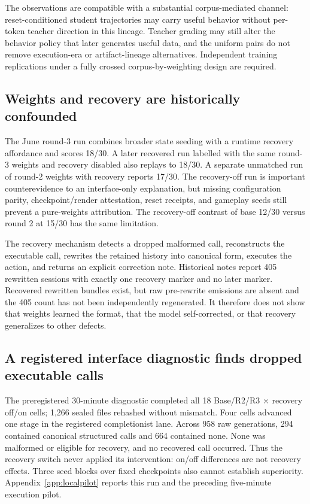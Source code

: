 \documentclass[11pt,a4paper]{article}
\begin{document}
The observations are compatible with a substantial corpus-mediated channel:
reset-conditioned student trajectories may carry useful behavior without
per-token teacher direction in this lineage. Teacher grading may still alter
the behavior policy that later generates useful data, and the uniform pairs do not remove
execution-era or artifact-lineage alternatives. Independent training
replications under a fully crossed corpus-by-weighting design are required.

\subsection{Weights and recovery are historically confounded}

The June round-3 run combines broader state seeding with a runtime recovery
affordance and scores 18/30. A later recovered run labelled with the same
round-3 weights and recovery disabled also replays to 18/30. A separate
unmatched run of round-2 weights with recovery reports 17/30. The recovery-off
run is important counterevidence to an interface-only explanation, but missing
configuration parity, checkpoint/render attestation, reset receipts, and
gameplay seeds still prevent a pure-weights attribution. The recovery-off
contrast of base 12/30 versus round 2 at 15/30 has the same limitation.

The recovery mechanism detects a dropped malformed call, reconstructs the
executable call, rewrites the retained history into canonical form, executes the
action, and returns an explicit correction note. Historical notes report 405
rewritten sessions with exactly one recovery marker and no later marker.
Recovered rewritten bundles exist, but raw pre-rewrite emissions are absent and
the 405 count has not been independently regenerated. It therefore does not show
that weights learned the format, that the model self-corrected, or that recovery
generalizes to other defects.

\subsection{A registered interface diagnostic finds dropped executable calls}

The preregistered 30-minute diagnostic completed all 18 Base/R2/R3
$\times$ recovery off/on cells; 1,266 sealed files rehashed without mismatch.
Four cells advanced one stage in the registered completionist lane. Across 958 raw generations, 294
contained canonical structured calls and 664 contained none. None was malformed
or eligible for recovery, and no recovered call occurred. Thus the recovery
switch never applied its intervention: on/off differences are not recovery
effects. Three seed blocks over fixed checkpoints also cannot establish
superiority. Appendix~\ref{app:localpilot} reports this run and the preceding
five-minute execution pilot.
\end{document}
